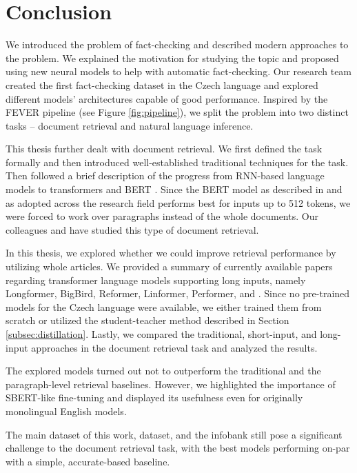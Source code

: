 \chapter*{Conclusion}

We introduced the problem of fact-checking and described modern approaches to the problem.
We explained the motivation for studying the topic and proposed using new neural models to help with automatic fact-checking.
Our research team created the first fact-checking dataset in the Czech language \citep{ullrich} and explored different models' architectures capable of good performance.
Inspired by the FEVER pipeline \citep{fever} (see Figure \ref{fig:pipeline}), we split the problem into two distinct tasks -- document retrieval and natural language inference.

This thesis further dealt with document retrieval.
We first defined the task formally and then introduced well-established traditional techniques for the task.
Then followed a brief description of the progress from RNN-based language models to transformers \citep{attention-is-all-you-need} and BERT \citep{bert}.
Since the BERT model as described in \citep{bert} and as adopted across the research field performs best for inputs up to 512 tokens, we were forced to work over paragraphs instead of the whole documents. 
Our colleagues \citep{rypar} and \citep{dedkova} have studied this type of document retrieval.

In this thesis, we explored whether we could improve retrieval performance by utilizing whole articles. 
We provided a summary of currently available papers regarding transformer language models supporting long inputs, namely Longformer, BigBird, Reformer, Linformer, Performer, and \nystr{}.
Since no pre-trained models for the Czech language were available, we either trained them from scratch or utilized the student-teacher method \citep{student-teacher} described in Section \ref{subsec:distillation}.
Lastly, we compared the traditional, short-input, and long-input approaches in the document retrieval task and analyzed the results.

The explored models turned out not to outperform the traditional and the paragraph-level retrieval baselines. However, we highlighted the importance of SBERT-like fine-tuning and displayed its usefulness even for originally monolingual English models.

The main dataset of this work, \CTK{} dataset, and the \CTK{} infobank still pose a significant challenge to the document retrieval task, with the best models performing on-par with a simple, accurate-based baseline.

